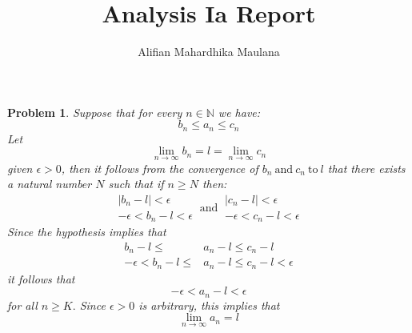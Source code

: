 \documentclass[a4paper,12pt]{article}
\title{Analysis Ia Report}
\author{Alifian Mahardhika Maulana}
\newtheorem{prob}{Problem}[]
\newcommand{\N}{\mathbb{N}}
\begin{document}
\maketitle
\begin{prob}
	Suppose that for every $n\in \N$ we have:
	\begin{equation*}
	b_n \leq a_n \leq c_n
	\end{equation*}
	Let \begin{equation*}
	\lim_{n\to\infty}b_n = l =\lim_{n\to\infty}c_n
	\end{equation*}
	given $\epsilon > 0$, then it follows from the convergence of $b_n\ \text{and}\ c_n\ \text{to}\ l$ that there exists a natural number $N$ such that if $n\geq N$ then:
	\begin{equation*}
	\begin{aligned}
	|b_n-l|<\epsilon\\
	-\epsilon < b_n-l < \epsilon
	\end{aligned}
	\ \text{and}\
	\begin{aligned}
	|c_n-l|<\epsilon\\
	-\epsilon < c_n-l < \epsilon
	\end{aligned}	
	\end{equation*}
	Since the hypothesis implies that
	\begin{equation*}
	\begin{aligned}
	b_n-l \leq &a_n-l \leq c_n-l\\
	-\epsilon<b_n-l \leq &a_n-l \leq c_n-l < \epsilon
	\end{aligned}
	\end{equation*}
	it follows that
	\begin{equation*}
	-\epsilon < a_n-l < \epsilon
	\end{equation*}
	for all $n\geq K.$ Since $\epsilon > 0$ is arbitrary, this implies that
	\begin{equation*}
	\lim_{n\to\infty} a_n =l
	\end{equation*}
\end{prob}
\end{document}
